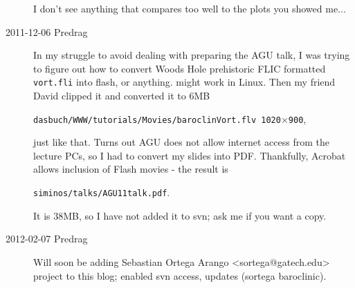 \begin{description}
I don't see anything that compares too well to the plots you showed me...

\item[2011-12-06 Predrag] In my struggle to avoid dealing with preparing the
AGU talk, I was trying to figure out how to convert Woods Hole prehistoric
FLIC formatted \texttt{vort.fli} into flash, or anything.
 might work in Linux.
Then my friend David clipped it and converted it to 6MB

\texttt{dasbuch/WWW/tutorials/Movies/baroclinVort.flv 1020$\times$900},

\noindent
just like that. Turns out AGU does not allow internet access from the
lecture PCs, so I had to convert my
 slides
into PDF. Thankfully, Acrobat allows inclusion of Flash movies - the
result is

\texttt{siminos/talks/AGU11talk.pdf}.

\noindent
It is 38MB, so I have not
added it to svn; ask me if you want a copy.

\item[2012-02-07 Predrag] Will soon be adding Sebastian Ortega Arango
<sortega@gatech.edu> project to this blog; enabled svn access, updates
(sortega  baroclinic).

\end{description}
